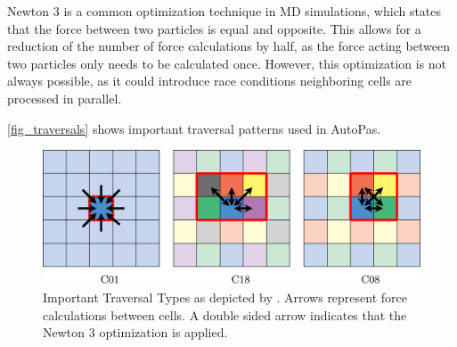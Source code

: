 \documentclass[conference]{IEEEtran}
\begin{document}
Newton 3 is a common optimization technique in MD simulations, which states that the force between two particles is equal and opposite. This allows for a reduction of the number of force calculations by half, as the force acting between two particles only needs to be calculated once. However, this optimization is not always possible, as it could introduce race conditions neighboring cells are processed in parallel.

\autoref{fig_traversals} shows important traversal patterns used in AutoPas.

\begin{figure}[h]
    \centering
    \includegraphics[width=\columnwidth]{figures/traversals.jpg}
    \caption{Important Traversal Types as depicted by \cite{NEWCOME2023115278}.
        Arrows represent force calculations between cells. A double sided arrow indicates that the Newton 3 optimization is applied.}
    \label{fig_traversals}
\end{figure}
\end{document}
